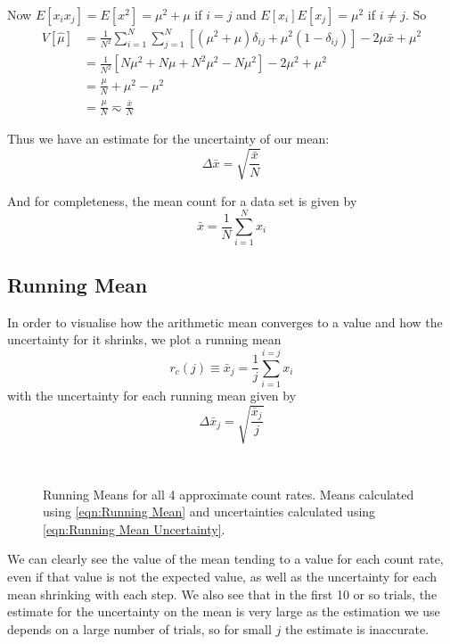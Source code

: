 \documentclass[12pt]{article}
\numberwithin{equation}{section}
\numberwithin{figure}{section}
\numberwithin{table}{section}
\begin{document}
\par Now $E[x_ix_j]=E[x^2]=\mu^2+\mu$ if $i=j$ and $E[x_i]E[x_j]=\mu^2$ if $i\neq j$. So 
\begin{align*}
    V[\hat\mu]&=\frac{1}{N^2}\sum_{i=1}^N\sum_{j=1}^N\left[(\mu^2+\mu)\delta_{ij}+\mu^2(1-\delta_{ij})\right]-2\mu\bar{x}+\mu^2\\
    &=\frac{1}{N^2}[N\mu^2+N\mu+N^2\mu^2-N\mu^2]-2\mu^2+\mu^2\\
    &=\frac{\mu}{N}+\mu^2-\mu^2\\
    &=\frac{\mu}{N}\eqsim\frac{\bar{x}}{N}
\end{align*}
\par Thus we have an estimate for the uncertainty of our mean: 
\begin{equation}
    \Delta \bar{x}=\sqrt{\frac{\bar{x}}{N}}
    \label{eqn:Mean Count Uncertainty}
\end{equation}
\par And for completeness, the mean count for a data set is given by
\begin{equation}
    \bar{x}=\frac{1}{N}\sum_{i=1}^N x_i
    \label{eqn:Mean Count}
\end{equation}

\subsection{Running Mean}\label{sec:Running Mean}
\par In order to visualise how the arithmetic mean converges to a value and how the uncertainty for it shrinks, we plot a running mean 
\begin{equation}
    r_c(j)\equiv\bar{x}_j=\frac{1}{j}\sum_{i=1}^{i=j}x_i
    \label{eqn:Running Mean}
\end{equation}
with the uncertainty for each running mean given by
\begin{equation}
    \Delta \bar{x}_j=\sqrt{\frac{\bar{x}_j}{j}}
    \label{eqn:Running Mean Uncertainty}
\end{equation}

\begin{figure}[H]%
    \centering
    \,
    \,
    \,
    \caption{Running Means for all 4 approximate count rates. Means calculated using \autoref{eqn:Running Mean} and uncertainties calculated using \autoref{eqn:Running Mean Uncertainty}.}
    \label{fig:Running Mean}
\end{figure}
\par We can clearly see the value of the mean tending to a value for each count rate, even if that value is not the expected value, as well as the uncertainty for each mean shrinking with each step. We also see that in the first 10 or so trials, the estimate for the uncertainty on the mean is very large as the estimation we use depends on a large number of trials, so for small $j$ the estimate is inaccurate.
\end{document}

